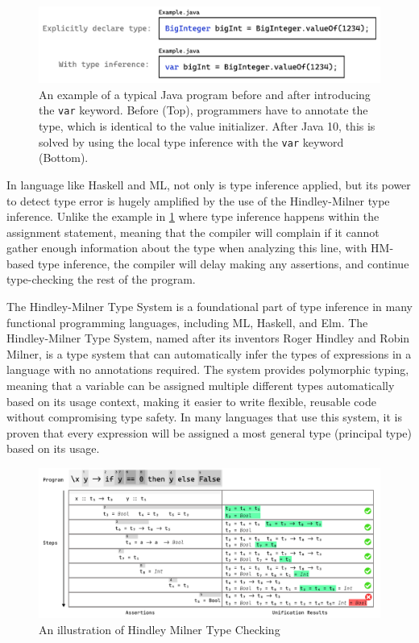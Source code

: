 \begin{figure}[hbt]
  \includegraphics[width=\linewidth]{ExampleJava}
  \caption{
    \label{fig:example-java}
      An example of a typical Java program before and after introducing the \texttt{var} keyword. Before (Top), programmers have to annotate the type, which is identical to the value initializer. After Java 10, this is solved by using the local type inference with the \texttt{var} keyword (Bottom).
    }
\end{figure}

In language like Haskell and ML, not only is type inference applied, but its power to detect type error is hugely amplified by the use of the Hindley-Milner type inference. Unlike the example in \ref{fig:example-java} where type inference happens within the assignment statement, meaning that the compiler will complain if it cannot gather enough information about the type when analyzing this line, with HM-based type inference, the compiler will delay making any assertions, and continue type-checking the rest of the program. 

The Hindley-Milner Type System \cite{Damas1982-zw} is a foundational part of type inference in many functional programming languages, including ML, Haskell, and Elm. The Hindley-Milner Type System, named after its inventors Roger Hindley and Robin Milner, is a type system that can automatically infer the types of expressions in a language with no annotations required. The system provides polymorphic typing, meaning that a variable can be assigned multiple different types automatically based on its usage context, making it easier to write flexible, reusable code without compromising type safety. In many languages that use this system, it is proven that every expression will be assigned a most general type (principal type) based on its usage. 



\begin{figure}[hbt]
    \includegraphics[width=\linewidth]{Hindley-Milner}
    \caption{
      \label{fig:hindley-milner}
        An illustration of Hindley Milner Type Checking}
\end{figure}


